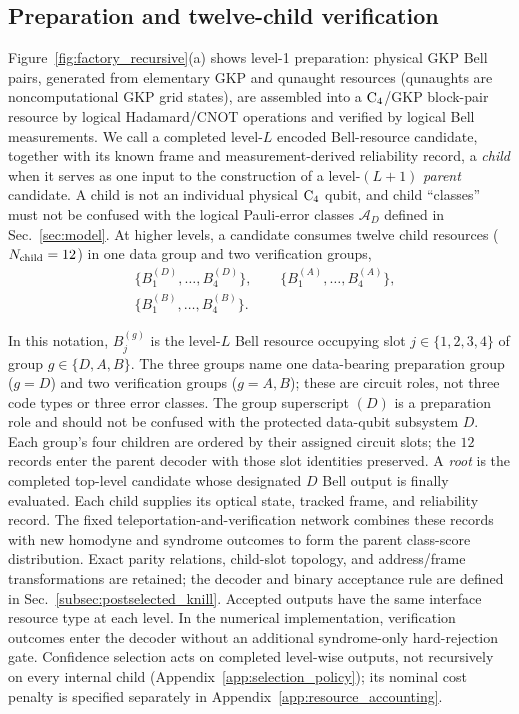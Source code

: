 \documentclass[aps,
prx,
superscriptaddress,
reprint,
longbibliography,
floatfix]{revtex4-2}
\begin{document}
\subsection{Preparation and twelve-child verification}\label{sec:circuit_level}
Figure~\ref{fig:factory_recursive}(a) shows level-1 preparation: physical GKP Bell pairs, generated from elementary GKP and qunaught resources (qunaughts are noncomputational GKP grid states), are assembled into a ${\rm C_4}$/GKP block-pair resource by logical Hadamard/CNOT operations and verified by logical Bell measurements. We call a completed level-$L$ encoded Bell-resource candidate, together with its known frame and measurement-derived reliability record, a \emph{child} when it serves as one input to the construction of a level-$(L+1)$ \emph{parent} candidate. A child is not an individual physical ${\rm C_4}$ qubit, and child ``classes'' must not be confused with the logical Pauli-error classes $\mathcal A_D$ defined in Sec.~\ref{sec:model}. At higher levels, a candidate consumes twelve child resources ($N_{\rm child}=12$) in one data group and two verification groups,
\begin{align}
&\{B^{(D)}_1,\ldots,B^{(D)}_4\},\qquad
\{B^{(A)}_1,\ldots,B^{(A)}_4\},\nonumber\\
&\{B^{(B)}_1,\ldots,B^{(B)}_4\}.
\end{align}

In this notation, $B_j^{(g)}$ is the level-$L$ Bell resource occupying slot $j\in\{1,2,3,4\}$ of group $g\in\{D,A,B\}$. The three groups name one data-bearing preparation group ($g=D$) and two verification groups ($g=A,B$); these are circuit roles, not three code types or three error classes. The group superscript $(D)$ is a preparation role and should not be confused with the protected data-qubit subsystem $D$. Each group's four children are ordered by their assigned circuit slots; the $12$ records enter the parent decoder with those slot identities preserved. A \emph{root} is the completed top-level candidate whose designated $D$ Bell output is finally evaluated. Each child supplies its optical state, tracked frame, and reliability record. The fixed teleportation-and-verification network combines these records with new homodyne and syndrome outcomes to form the parent class-score distribution. Exact parity relations, child-slot topology, and address/frame transformations are retained; the decoder and binary acceptance rule are defined in Sec.~\ref{subsec:postselected_knill}. Accepted outputs have the same interface resource type at each level. In the numerical implementation, verification outcomes enter the decoder without an additional syndrome-only hard-rejection gate. Confidence selection acts on completed level-wise outputs, not recursively on every internal child (Appendix~\ref{app:selection_policy}); its nominal cost penalty is specified separately in Appendix~\ref{app:resource_accounting}.
\end{document}
